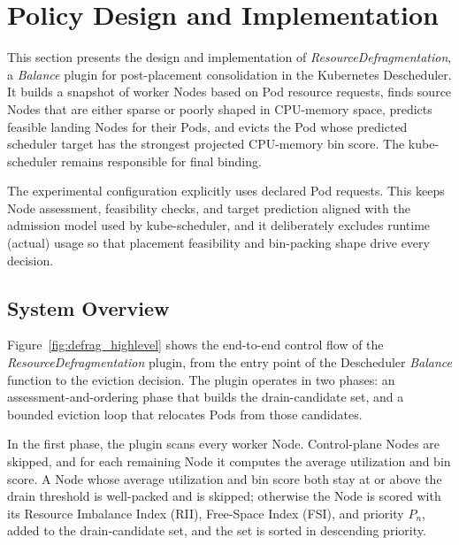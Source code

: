 \section{Policy Design and Implementation}
\label{bab:3}

This section presents the design and implementation of \textit{ResourceDefragmentation}, a \textit{Balance} plugin for post-placement consolidation in the Kubernetes Descheduler. It builds a snapshot of worker Nodes based on Pod resource requests, finds source Nodes that are either sparse or poorly shaped in CPU-memory space, predicts feasible landing Nodes for their Pods, and evicts the Pod whose predicted scheduler target has the strongest projected CPU-memory bin score. The kube-scheduler remains responsible for final binding.

The experimental configuration explicitly uses declared Pod requests. This keeps Node assessment, feasibility checks, and target prediction aligned with the admission model used by kube-scheduler, and it deliberately excludes runtime (actual) usage so that placement feasibility and bin-packing shape drive every decision.

\subsection{System Overview}
\label{sec:defrag_system_overview}

Figure~\ref{fig:defrag_highlevel} shows the end-to-end control flow of the \textit{ResourceDefragmentation} plugin, from the entry point of the Descheduler \textit{Balance} function to the eviction decision. The plugin operates in two phases: an assessment-and-ordering phase that builds the drain-candidate set, and a bounded eviction loop that relocates Pods from those candidates.

In the first phase, the plugin scans every worker Node. Control-plane Nodes are skipped, and for each remaining Node it computes the average utilization and bin score. A Node whose average utilization and bin score both stay at or above the drain threshold is well-packed and is skipped; otherwise the Node is scored with its Resource Imbalance Index (RII), Free-Space Index (FSI), and priority \(P_n\), added to the drain-candidate set, and the set is sorted in descending priority.

